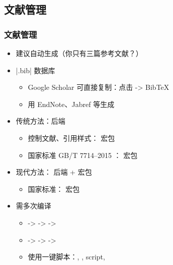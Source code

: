   \subsection{文献管理}
  \begin{frame}[fragile]
    \frametitle{文献管理}
    \begin{itemize}
      \item 建议自动生成\pause （你只有三篇参考文献？）\pause
      \item |.bib| 数据库
    
        \begin{itemize}
          \item Google Scholar 可直接复制：点击 \faQuoteRight \quad -> BibTeX
          \item 用 EndNote、Jabref 等生成
        \end{itemize} \pause
    
      \item 传统方法：\BibTeX  后端
    
        \begin{itemize}
          \item 控制文献、引用样式： 宏包
          \item 国家标准 GB/T 7714--2015
                ：
                \alert{ 宏包}
        \end{itemize} \pause
    
      \item 现代方法： 后端 +  宏包
    
        \begin{itemize}
          \item 国家标准： 宏包
        \end{itemize} \pause
    
      \item 需多次编译
        \begin{itemize}
          \item \pdfLaTeX -> \BibTeX -> \pdfLaTeX -> \pdfLaTeX
          \item \XeLaTeX -> \BibTeX -> \XeLaTeX -> \XeLaTeX
          \item 使用一键脚本：, ,  script, 
        \end{itemize}
      
    \end{itemize}
\end{frame}

